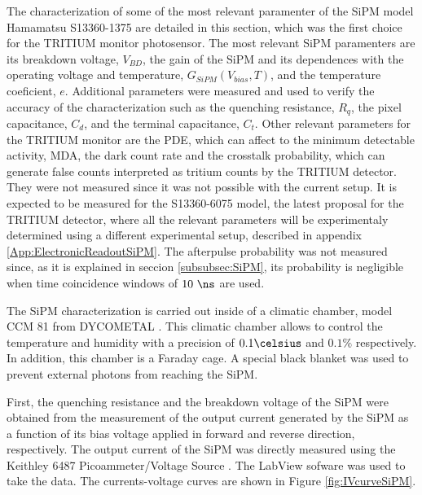 The characterization of some of the most relevant paramenter of the SiPM model Hamamatsu S13360-1375 are detailed in this section, which was the first choice for the TRITIUM monitor photosensor. The most relevant SiPM paramenters are its breakdown voltage, $V_{BD}$, the gain of the SiPM and its dependences with the operating voltage and temperature, $G_{SiPM}(V_{bias}, T)$, and the temperature coeficient, $e$. Additional parameters were measured and used to verify the accuracy of the characterization such as the quenching resistance, $R_q$, the pixel capacitance, $C_d$, and the terminal capacitance, $C_t$. Other relevant parameters for the TRITIUM monitor are the PDE, which can affect to the minimum detectable activity, MDA, the dark count rate and the crosstalk probability, which can generate false counts interpreted as tritium counts by the TRITIUM detector. They were not measured since it was not possible with the current setup. It is expected to be measured for the S13360-6075 model, the latest proposal for the TRITIUM detector, where all the relevant parameters will be experimentaly determined using a different experimental setup, described in appendix \ref{App:ElectronicReadoutSiPM}. The afterpulse probability was not measured since, as it is explained in seccion \ref{subsubsec:SiPM}, its probability is negligible when time coincidence windows of $10~\ns$ are used.

The SiPM characterization is carried out inside of a climatic chamber, model CCM 81 from DYCOMETAL \cite{ClimaticChamberIFIMED}. This climatic chamber allows to control the temperature and humidity with a precision of $0.1\celsius$ and $0.1\%$ respectively. In addition, this chamber is a Faraday cage. A special black blanket \cite{BlackBlancket} was used to prevent external photons from reaching the SiPM.

First, the quenching resistance and the breakdown voltage of the SiPM were obtained from the measurement of the output current generated by the SiPM as a function of its bias voltage applied in forward and reverse direction, respectively. The output current of the SiPM was directly measured using the Keithley 6487 Picoammeter/Voltage Source \cite{DataSheetKeithley6487}. The LabView sofware was used to take the data. The currents-voltage curves are shown in Figure \ref{fig:IVcurveSiPM}.

